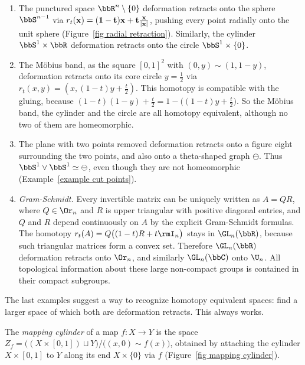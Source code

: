 \begin{example}\label{example deformation retracts}
    \begin{enumerate}
        \item The punctured space $\bbR^n\setminus\{0\}$ deformation retracts onto the sphere $\bbS^{n-1}$ via $r_t(\bf{x})=(1-t)\bf{x}+t\frac{\bf{x}}{\lvert \bf{x}\rvert}$, pushing every point radially onto the unit sphere (Figure~\ref{fig radial retraction}). Similarly, the cylinder $\bbS^1\times\bbR$ deformation retracts onto the circle $\bbS^1\times\{0\}$.
        \item The M\"obius band, as the square $[0,1]^2$ with $(0,y)\sim(1,1-y)$, deformation retracts onto its core circle $y=\frac12$ via $r_t(x,y)=(x,(1-t)y+\frac t2)$. This homotopy is compatible with the gluing, because $(1-t)(1-y)+\frac t2=1-\big((1-t)y+\frac t2\big)$. So the M\"obius band, the cylinder and the circle are all homotopy equivalent, although no two of them are homeomorphic.
        \item The plane with two points removed deformation retracts onto a figure eight surrounding the two points, and also onto a theta-shaped graph $\ominus$. Thus $\bbS^1\vee\bbS^1\simeq\ominus$, even though they are not homeomorphic (Example~\ref{example cut points}).
        \item \emph{Gram-Schmidt.} Every invertible matrix can be uniquely written as $A=QR$, where $Q\in\Or_n$ and $R$ is upper triangular with positive diagonal entries, and $Q$ and $R$ depend continuously on $A$ by the explicit Gram-Schmidt formulas. The homotopy $r_t(A)=Q\big((1-t)R+t\rmI_n\big)$ stays in $\GL_n(\bbR)$, because such triangular matrices form a convex set. Therefore $\GL_n(\bbR)$ deformation retracts onto $\Or_n$, and similarly $\GL_n(\bbC)$ onto $\U_n$. All topological information about these large non-compact groups is contained in their compact subgroups.
    \end{enumerate}
\end{example}

The last examples suggest a way to recognize homotopy equivalent spaces: find a larger space of which both are deformation retracts. This always works.

\begin{defn}
    The \emph{mapping cylinder} of a map $f:X\to Y$ is the space $Z_f=\big((X\times[0,1])\sqcup Y\big)/\big((x,0)\sim f(x)\big)$, obtained by attaching the cylinder $X\times[0,1]$ to $Y$ along its end $X\times\{0\}$ via $f$ (Figure~\ref{fig mapping cylinder}).
\end{defn}

